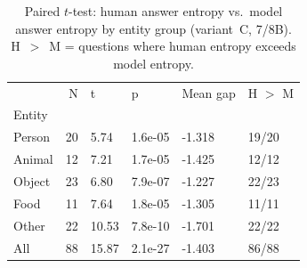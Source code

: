 \begin{table}[t]
\centering
\caption{Paired $t$-test: human answer entropy vs.\ model answer entropy by entity group (variant~C, 7/8B). H~$>$~M = questions where human entropy exceeds model entropy.}
\label{tab:entropy_ttest}
\small
\begin{tabular}{lrllll}
\toprule
 & N & t & p & Mean gap & H $>$ M \\
Entity &  &  &  &  &  \\
\midrule
Person & 20 & 5.74 & 1.6e-05 & -1.318 & 19/20 \\
Animal & 12 & 7.21 & 1.7e-05 & -1.425 & 12/12 \\
Object & 23 & 6.80 & 7.9e-07 & -1.227 & 22/23 \\
Food & 11 & 7.64 & 1.8e-05 & -1.305 & 11/11 \\
Other & 22 & 10.53 & 7.8e-10 & -1.701 & 22/22 \\
All & 88 & 15.87 & 2.1e-27 & -1.403 & 86/88 \\
\bottomrule
\end{tabular}
\end{table}
